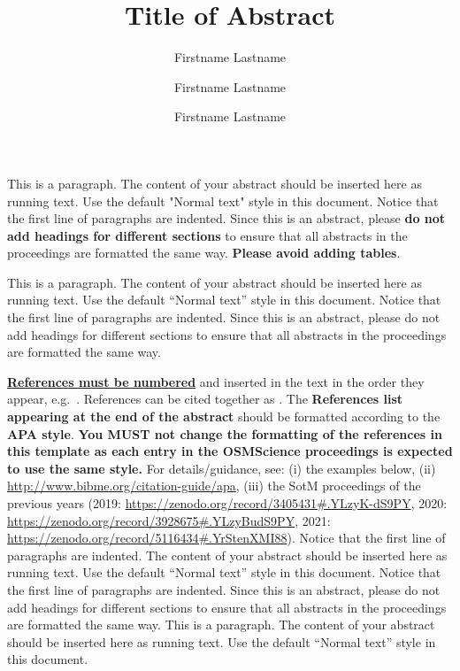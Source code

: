 \documentclass{osmscience}
\title{Title of Abstract}
\author[1,*]{Firstname Lastname}
\author[1]{Firstname Lastname}
\author[2]{Firstname Lastname}
\affil[1]{
    Department/Lab/Unit, Name of Institution, City, Country\\
    \href{mailto:author1@institution1.com}{\underline{author1@institution1.com}}, 
    \quad
    \href{mailto:author2@institution1.com}{\underline{author2@institution1.com}}
}
\affil[2]{
    GIS Center, Florida International University, Miami, FL, USA\\
    \href{mailto:author@institution.edu}{\underline{author@institution.edu}}
}
\date{}
\begin{document}
\maketitle

\vspace{1em}

This is a paragraph. The content of your abstract should be inserted here as running text. 
Use the default "Normal text" style in this document. 
Notice that the first line of paragraphs are indented. 
Since this is an abstract, please \textbf{do not add headings for different sections} to ensure that all abstracts in the proceedings are formatted the same way. 
\textbf{Please avoid adding tables}.

This is a paragraph. 
The content of your abstract should be inserted here as running text. 
Use the default “Normal text” style in this document. 
Notice that the first line of paragraphs are indented. 
Since this is an abstract, please do not add headings for different sections to ensure that all abstracts in the proceedings are formatted the same way.

\textbf{\underline{References must be numbered}} and inserted in the text in the order they appear, e.g.~\cite{haklay2010good}. 
References can be cited together as \cite{barron2014comprehensive, de2007geospatial}. 
The \textbf{References list appearing at the end of the abstract} should be formatted according to the \textbf{APA style}. \textbf{You MUST not change the formatting of the references in this template as each entry in the OSMScience proceedings is expected to use the same style.}
For details/guidance, see: 
(i) the examples below, 
(ii) \url{http://www.bibme.org/citation-guide/apa}, 
(iii) the SotM proceedings of the previous years (2019: \url{https://zenodo.org/record/3405431#.YLzyK-dS9PY}, 2020: \url{https://zenodo.org/record/3928675#.YLzyBudS9PY}, 2021: \url{https://zenodo.org/record/5116434#.YrStenXMI88}). 
Notice that the first line of paragraphs are indented. 
The content of your abstract should be inserted here as running text. 
Use the default “Normal text” style in this document. 
Notice that the first line of paragraphs are indented. 
Since this is an abstract, please do not add headings for different sections to ensure that all abstracts in the proceedings are formatted the same way. 
This is a paragraph. 
The content of your abstract should be inserted here as running text. 
Use the default “Normal text” style in this document.
\end{document}
